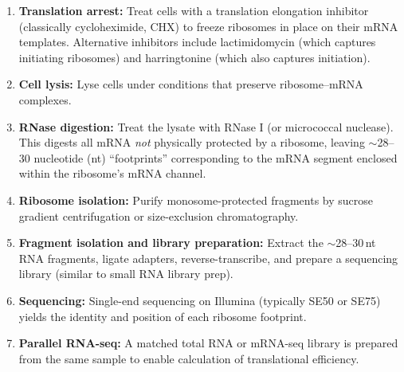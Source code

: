 \begin{protocolbox}[title={Ribo-seq Protocol}]
\begin{enumerate}[itemsep=2pt]
  \item \textbf{Translation arrest:} Treat cells with a translation elongation inhibitor (classically cycloheximide, CHX) to freeze ribosomes in place on their mRNA templates. Alternative inhibitors include lactimidomycin (which captures initiating ribosomes) and harringtonine (which also captures initiation).
  \item \textbf{Cell lysis:} Lyse cells under conditions that preserve ribosome--mRNA complexes.
  \item \textbf{RNase digestion:} Treat the lysate with RNase I (or micrococcal nuclease). This digests all mRNA \textit{not} physically protected by a ribosome, leaving $\sim$28--30 nucleotide (nt) ``footprints'' corresponding to the mRNA segment enclosed within the ribosome's mRNA channel.
  \item \textbf{Ribosome isolation:} Purify monosome-protected fragments by sucrose gradient centrifugation or size-exclusion chromatography.
  \item \textbf{Fragment isolation and library preparation:} Extract the $\sim$28--30\,nt RNA fragments, ligate adapters, reverse-transcribe, and prepare a sequencing library (similar to small RNA library prep).
  \item \textbf{Sequencing:} Single-end sequencing on Illumina (typically SE50 or SE75) yields the identity and position of each ribosome footprint.
  \item \textbf{Parallel RNA-seq:} A matched total RNA or mRNA-seq library is prepared from the same sample to enable calculation of translational efficiency.
\end{enumerate}
\end{protocolbox}


